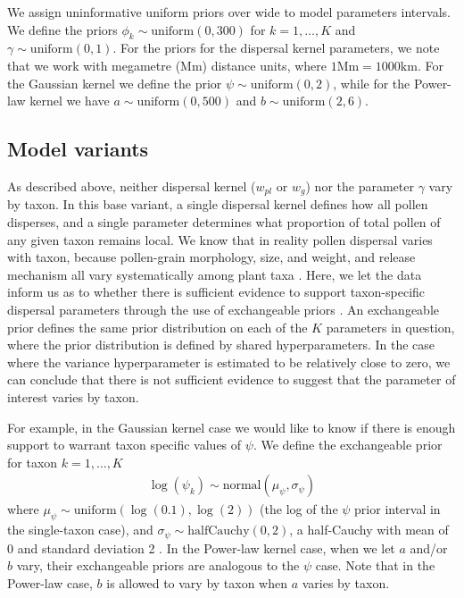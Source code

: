 \documentclass[12pt]{article}
\begin{document}
We assign uninformative uniform priors over wide to model parameters
intervals. We define the priors $\phi_k \sim \text{uniform}(0, 300)$
for $k=1, \ldots, K$ and $\gamma \sim \text{uniform}(0,1)$. For the
priors for the dispersal kernel parameters, we note that we work with
megametre (Mm) distance units, where $1 \text{Mm} = 1000
\text{km}$. For the Gaussian kernel we define the prior $\psi \sim
\text{uniform}(0, 2)$, while for the Power-law kernel we have $a \sim
\text{uniform}(0, 500)$ and $b \sim \text{uniform}(2, 6)$.

\subsection{Model variants}

As described above, neither dispersal kernel ($w_{pl}$ or $w_g$) nor
the parameter $\gamma$ vary by taxon. In this base variant, a single
dispersal kernel defines how all pollen disperses, and a single
parameter determines what proportion of total pollen of any given
taxon remains local. We know that in reality pollen dispersal varies
with taxon, because pollen-grain morphology, size, and weight, and
release mechanism all vary systematically among plant taxa
\citep{jackson1999pollen}. Here, we let the data inform us as to
whether there is sufficient evidence to support taxon-specific
dispersal parameters through the use of exchangeable priors
\citep{gelman2014bayesian}. An exchangeable prior defines the same
prior distribution on each of the $K$ parameters in question, where
the prior distribution is defined by shared hyperparameters. In the
case where the variance hyperparameter is estimated to be relatively
close to zero, we can conclude that there is not sufficient evidence
to suggest that the parameter of interest varies by taxon.

For example, in the Gaussian kernel case we would like to know
if there is enough support to warrant taxon specific values of
$\psi$. We define the exchangeable prior for taxon $k=1, \ldots, K$
\begin{align}
\log(\psi_k) \sim \text{normal}( \mu_{\psi}, \sigma_{\psi})
\end{align}
where $\mu_{\psi} \sim \text{uniform}(\log(0.1),\log(2))$ (the log of
the $\psi$ prior interval in the single-taxon case), and
$\sigma_{\psi} \sim \text{halfCauchy}(0, 2)$, a half-Cauchy with mean
of 0 and standard deviation 2 \citep{gelman2006prior}. In the
Power-law kernel case, when we let $a$ and/or $b$ vary, their
exchangeable priors are analogous to the $\psi$ case. Note that in the
Power-law case, $b$ is allowed to vary by taxon when $a$ varies by
taxon.
\end{document}
